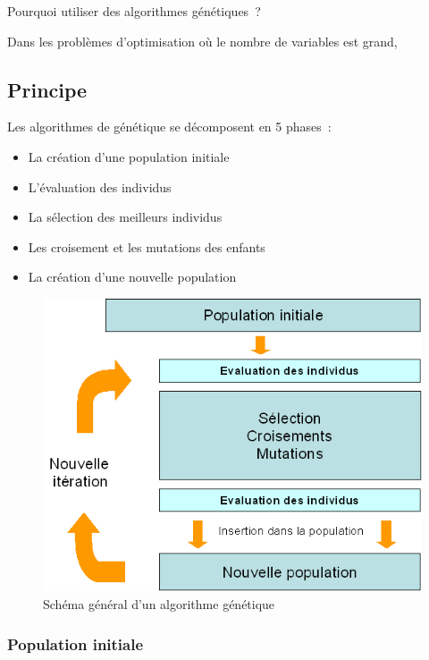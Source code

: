 \documentclass{article}
\begin{document}
	Pourquoi utiliser des algorithmes génétiques ?

	Dans les problèmes d'optimisation où le nombre de variables est grand, 

	\subsection{Principe}
	Les algorithmes de génétique se décomposent en 5 phases :
	\begin{itemize}
	\item La création d'une population initiale
	\item L'évaluation des individus
	\item La sélection des meilleurs individus
	\item Les croisement et les mutations des enfants
	\item La création d'une nouvelle population
	\end{itemize}

	\begin{figure}
		\begin{center}
			\includegraphics[scale=0.5]{schema_gen.png}
		\end{center}

		\caption{Schéma général d'un algorithme génétique}

		\label{Schéma général d'un algorithme génétique}
	\end{figure}


		\subsubsection{Population initiale}
\end{document}
